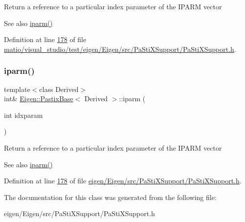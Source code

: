 Return a reference to a particular index parameter of the I\+P\+A\+RM vector \begin{DoxySeeAlso}{See also}
\hyperlink{class_eigen_1_1_pastix_base_a38378e7b2b5c750a8a23e2c21a69146c}{iparm()} 
\end{DoxySeeAlso}


Definition at line \hyperlink{matio_2visual__studio_2test_2eigen_2_eigen_2src_2_pa_sti_x_support_2_pa_sti_x_support_8h_source_l00178}{178} of file \hyperlink{matio_2visual__studio_2test_2eigen_2_eigen_2src_2_pa_sti_x_support_2_pa_sti_x_support_8h_source}{matio/visual\+\_\+studio/test/eigen/\+Eigen/src/\+Pa\+Sti\+X\+Support/\+Pa\+Sti\+X\+Support.\+h}.

\mbox{\label{class_eigen_1_1_pastix_base_a5509ca8d6a9217fb95ab020363b9e0fb}} 
\subsubsection{\texorpdfstring{iparm()}{iparm()}\hspace{0.1cm}{\footnotesize\ttfamily [4/4]}}
{\footnotesize\ttfamily template$<$class Derived$>$ \\
int\& \hyperlink{class_eigen_1_1_pastix_base}{Eigen\+::\+Pastix\+Base}$<$ Derived $>$\+::iparm (\begin{DoxyParamCaption}\item[{int}]{idxparam }\end{DoxyParamCaption})\hspace{0.3cm}{\ttfamily [inline]}}

Return a reference to a particular index parameter of the I\+P\+A\+RM vector \begin{DoxySeeAlso}{See also}
\hyperlink{class_eigen_1_1_pastix_base_a38378e7b2b5c750a8a23e2c21a69146c}{iparm()} 
\end{DoxySeeAlso}


Definition at line \hyperlink{eigen_2_eigen_2src_2_pa_sti_x_support_2_pa_sti_x_support_8h_source_l00178}{178} of file \hyperlink{eigen_2_eigen_2src_2_pa_sti_x_support_2_pa_sti_x_support_8h_source}{eigen/\+Eigen/src/\+Pa\+Sti\+X\+Support/\+Pa\+Sti\+X\+Support.\+h}.



The documentation for this class was generated from the following file\+:\begin{DoxyCompactItemize}
\item 
eigen/\+Eigen/src/\+Pa\+Sti\+X\+Support/\+Pa\+Sti\+X\+Support.\+h\end{DoxyCompactItemize}
